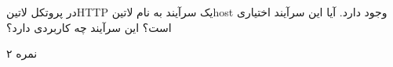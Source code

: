 \documentclass[../main.tex]{subfiles}
\begin{document}

در پروتکل ‌لاتین{HTTP} یک سرآیند به نام ‌لاتین{host} وجود دارد. آیا این سرآیند اختیاری است؟ این سرآیند چه کاربردی دارد؟

۲ نمره
\end{document}
